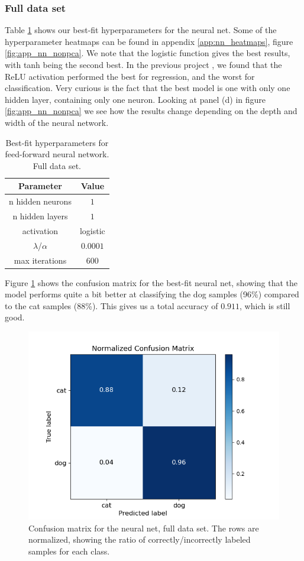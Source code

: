 \documentclass[a4paper]{article}
\begin{document}
\subsubsection{Full data set}
Table \ref{tab:best_fit_nn_nonpca} shows our best-fit hyperparameters for the neural net. Some of the hyperparameter heatmaps can be found in appendix \ref{app:nn_heatmaps}, figure \ref{fig:app_nn_nonpca}. We note that the logistic function gives the best results, with tanh being the second best. In the previous project \cite{Github2}, we found that the ReLU activation performed the best for regression, and the worst for classification. Very curious is the fact that the best model is one with only one hidden layer, containing only one neuron. Looking at panel (d) in figure \ref{fig:app_nn_nonpca} we see how the results change depending on the depth and width of the neural network.
\begin{table}[H]
  \centering
  \caption{Best-fit hyperparameters for feed-forward neural network. Full data set.}
  \label{tab:best_fit_nn_nonpca}
  \begin{tabular}{c|c}
    \hline\hline
    Parameter & Value\\\hline
    n hidden neurons &  $1$\\
    n hidden layers &  $1$\\
    activation & logistic \\
    $\lambda$/$\alpha$  & $0.0001$\\
    max iterations & $600$
    \end{tabular}
\end{table}
Figure \ref{fig:nn_confusion_nonpca} shows the confusion matrix for the best-fit neural net, showing that the model performs quite a bit better at classifying the dog samples (96\%) compared to the cat samples (88\%). This gives us a total accuracy of $0.911$, which is still good.
\begin{figure}[H]
	\centering
	\includegraphics[scale=0.6]{../figures/neural_net/confusion_matrix_nbins200_pca0_seed4155_ts0.20.png}
	\caption{Confusion matrix for the neural net, full data set. The rows are normalized, showing the ratio of correctly/incorrectly labeled samples for each class.}
	\label{fig:nn_confusion_nonpca}
\end{figure}	
\end{document}
